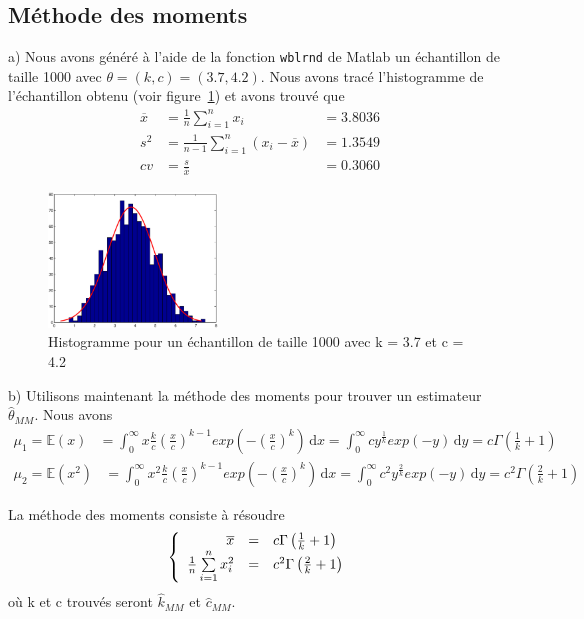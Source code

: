 \subsection{Méthode des moments}

a) Nous avons généré à l’aide de la fonction \texttt{wblrnd} de Matlab un échantillon de taille 1000 avec $\theta = (k,c) = (3.7,4.2)$. Nous avons tracé l'histogramme de l’échantillon obtenu (voir figure~\ref{fig:histo1}) et avons trouvé que 
\begin{align*}
\overline{x} &= \frac{1}{n}\sum\limits_{i=1}^n x_i &= 3.8036\\
s^2 &= \frac{1}{n-1}\sum\limits_{i=1}^n(x_i-\overline{x}) &= 1.3549\\
cv &= \frac{s}{\overline{x}} &= 0.3060
\end{align*}

\begin{figure}[!ht]
        \centering
        \includegraphics[width=0.4\textwidth]{graphes/histo1.eps}
        \caption{Histogramme pour un échantillon de taille 1000 avec k = 3.7 et c = 4.2}\label{fig:histo1}
\end{figure}

b)  Utilisons maintenant la méthode des moments pour trouver un estimateur $\hat\theta_{MM}$. Nous avons
\begin{align*}
\mu_1 = \mathbb{E}(x) &= \int_0^\infty \! x \frac{k}{c} \left(\frac{x}{c}\right)^{k-1} exp\left(-\left(\frac{x}{c}\right)^k\right) \, \mathrm{d}x
= \int_0^\infty \! c y^{\frac{1}{k}} exp(-y) \, \mathrm{d}y
= c\Gamma\left(\frac{1}{k}+1\right)
\end{align*}
\begin{align*}
\mu_2 = \mathbb{E}(x^2) &= \int_0^\infty \! x^2 \frac{k}{c} \left(\frac{x}{c}\right)^{k-1} exp\left(-\left(\frac{x}{c}\right)^k\right) \, \mathrm{d}x
= \int_0^\infty \! c^2 y^{\frac{2}{k}} exp(-y) \, \mathrm{d}y
= c^2\Gamma\left(\frac{2}{k}+1\right)
\end{align*}

La méthode des moments consiste à résoudre
\[
\left\{
\begin{array}{r c l}
\overline{x}  &=& c\Gamma\left(\frac{1}{k}+1\right)\\
\frac{1}{n}\sum\limits_{i=1}^n x_i ^2 &=& c^2\Gamma\left(\frac{2}{k}+1\right)
\end{array}
\right.
\]
où k et c trouvés seront $\hat{k}_{MM}$ et $\hat{c}_{MM}$.\\

